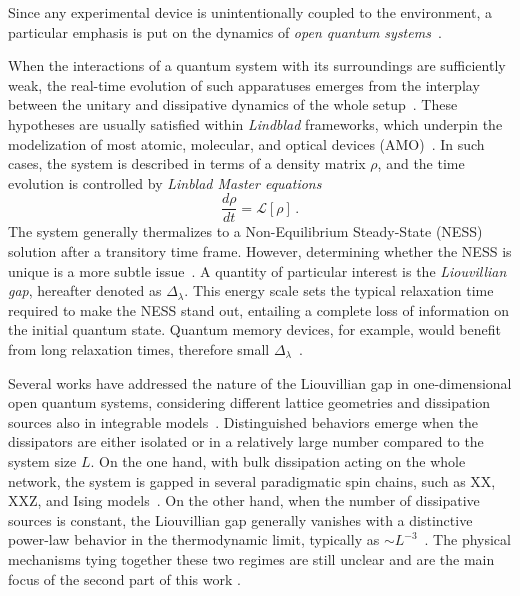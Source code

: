 Since any experimental device is unintentionally coupled to the environment, a particular emphasis is put on the dynamics of \textit{open quantum systems}~\cite{BP-openquantumsystembook}.

When the interactions of a quantum system with its surroundings are sufficiently weak, the real-time evolution of such apparatuses emerges from the interplay between the unitary and dissipative dynamics of the whole setup~\cite{RV-2021-coherentanddissipativedynamicsreview}. These hypotheses are usually satisfied within \textit{Lindblad} frameworks, which underpin the modelization of most atomic, molecular, and optical devices (AMO)~\cite{BDS-2015-KeldyshOptical}. In such cases, the system is described in terms of a density matrix $\rho$, and the time evolution is controlled by \textit{Linblad Master equations}
\begin{equation}
    \frac{d\rho}{dt} = \mathcal{L}[\rho]\,.
    \label{eq_def_intro_lindblad}
\end{equation}
The system generally thermalizes to a Non-Equilibrium Steady-State (NESS) solution after a transitory time frame. However, determining whether the NESS is unique is a more subtle issue~\cite{N-2019-uniquenesslindblad, SW-2010-openuniquesolution}. A quantity of particular interest is the \textit{Liouvillian gap}, hereafter denoted as $\Delta_\lambda$. This energy scale sets the typical relaxation time required to make the NESS stand out, entailing a complete loss of information on the initial quantum state. Quantum memory devices, for example, would benefit from long relaxation times, therefore small $\Delta_\lambda$~\cite{CCP-2011-quantummemories}.

Several works have addressed the nature of the Liouvillian gap in one-dimensional open quantum systems, considering different lattice geometries and dissipation sources also in integrable models~\cite{Z-2015-relaxtimes}. Distinguished behaviors emerge when the dissipators are either isolated or in a relatively large number compared to the system size $L$.
On the one hand, with bulk dissipation acting on the whole network, the system is gapped in several paradigmatic spin chains, such as XX, XXZ, and Ising models~\cite{YWHWD-2021-artificialnetweork, Z-2015-relaxtimes, KS-2019-nonhermitiankitaevladder}. On the other hand, when the number of dissipative sources is constant, the Liouvillian gap generally vanishes with a distinctive power-law behavior in the thermodynamic limit, typically as $\sim L^{-3}$~\cite{KS-2020-boundarydephasing, TV-2021-dissipativeboundaries, Z-2011-XXXchaingap}.
The physical mechanisms tying together these two regimes are still unclear and are the main focus of the second part of this work \cite{franchi2023Liouvillian}.

